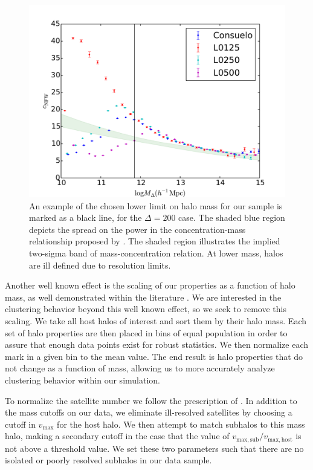 \documentclass[usenatbib,usegraphicx,letterpaper]{mn2e}
\begin{document}
\begin{figure}
	\centering
		\includegraphics[width=.5\textwidth]{masscut_cnfw_d200.pdf}
	\caption{An example of the chosen lower limit on halo mass for our sample is marked as a black line, for the $\Delta = 200$ case. The shaded blue region depicts the spread on the power in the concentration-mass relationship proposed by \citet{duffy08}.  The shaded region illustrates the implied two-sigma band of \citet{duffy08} mass-concentration relation. At lower mass, halos are ill defined due to resolution limits. }
\end{figure}


Another well known effect is the scaling of our properties as a function of halo mass, as well demonstrated within the literature \citep{duffy08}. We are interested in the clustering behavior beyond this well known effect, so we seek to remove this scaling. We take all host halos of interest and sort them by their halo mass. Each set of halo properties are then placed in bins of equal population in order to assure that enough data points exist for robust statistics. We then normalize each mark in a given bin to the mean value. The end result is halo properties that do not change as a function of mass, allowing us to more accurately analyze clustering behavior within our simulation.

To normalize the satellite number we follow the prescription of \citet{wechsler06}. In addition to the mass cutoffs on our data, we eliminate ill-resolved satellites by choosing a cutoff in $v_{\mathrm{max}}$ for the host halo. We then attempt to match subhalos to this mass halo, making a secondary cutoff in the case that the value of $v_{\mathrm{max,sub}} / v_{\mathrm{max,host}}$ is not above a threshold value. We set these two parameters such that there are no isolated or poorly resolved subhalos in our data sample.
\end{document}

